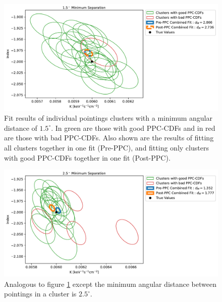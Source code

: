 \documentclass{report}
\begin{document}
\begin{figure}[H]
  \centering
  \includegraphics[width=\textwidth]{Images/PPC_and_Background_Analysis/combined_plot_0374_ppc_normal.pdf}
  \caption{Fit results of individual pointings clusters with a minimum angular distance of $1.5^\circ$. In green are those with good PPC-CDFs and in red are those with bad PPC-CDFs. Also shown are the results of fitting all clusters together in one fit (Pre-PPC), and fitting only clusters with good PPC-CDFs together in one fit (Post-PPC).}
  \label{ppc indv fits 1.5}
\end{figure}

\begin{figure}[H]
  \centering
  \includegraphics[width=\textwidth]{Images/PPC_and_Background_Analysis/combined_plot_0374_ppc_far.pdf}
  \caption{Analogous to figure \ref{ppc indv fits 1.5} except the minimum angular distance between pointings in a cluster is $2.5^\circ$.}
  \label{ppc indv fits 2.5}
\end{figure}
\end{document}
